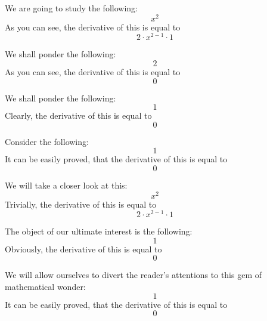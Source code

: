 \documentclass{article}
\begin{document}
We are going to study the following:
\begin{equation}
x ^{2 } 
\end{equation}
As you can see, the derivative of this is equal to
\begin{equation}
2 \cdot x ^{2 - 1 } \cdot 1 
\end{equation}

We shall ponder the following:
\begin{equation}
2 
\end{equation}
As you can see, the derivative of this is equal to
\begin{equation}
0 
\end{equation}

We shall ponder the following:
\begin{equation}
1 
\end{equation}
Clearly, the derivative of this is equal to
\begin{equation}
0 
\end{equation}

Consider the following:
\begin{equation}
1 
\end{equation}
It can be easily proved, that the derivative of this is equal to
\begin{equation}
0 
\end{equation}

We will take a closer look at this:
\begin{equation}
x ^{2 } 
\end{equation}
Trivially, the derivative of this is equal to
\begin{equation}
2 \cdot x ^{2 - 1 } \cdot 1 
\end{equation}

The object of our ultimate interest is the following:
\begin{equation}
1 
\end{equation}
Obviously, the derivative of this is equal to
\begin{equation}
0 
\end{equation}

We will allow ourselves to divert the reader's attentions to this gem of mathematical wonder:
\begin{equation}
1 
\end{equation}
It can be easily proved, that the derivative of this is equal to
\begin{equation}
0 
\end{equation}
\end{document}
